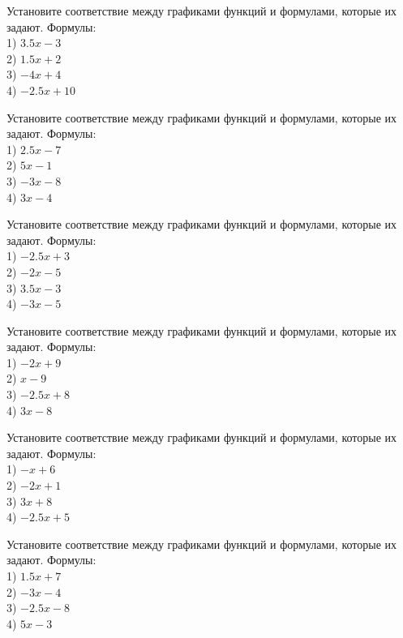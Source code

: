 \documentclass[4apaper]{article}
\begin{document}
\begin{taskBN}{49}
Установите соответствие между графиками функций и формулами, которые их задают. Формулы: \\1) $3.5x-3$\\2) $1.5x+2$\\3) $-4x+4$\\4) $-2.5x+10$
\end{taskBN}

\begin{taskBN}{50}
Установите соответствие между графиками функций и формулами, которые их задают. Формулы: \\1) $2.5x-7$\\2) $5x-1$\\3) $-3x-8$\\4) $3x-4$
\end{taskBN}

\begin{taskBN}{51}
Установите соответствие между графиками функций и формулами, которые их задают. Формулы: \\1) $-2.5x+3$\\2) $-2x-5$\\3) $3.5x-3$\\4) $-3x-5$
\end{taskBN}

\begin{taskBN}{52}
Установите соответствие между графиками функций и формулами, которые их задают. Формулы: \\1) $-2x+9$\\2) $x-9$\\3) $-2.5x+8$\\4) $3x-8$
\end{taskBN}

\begin{taskBN}{53}
Установите соответствие между графиками функций и формулами, которые их задают. Формулы: \\1) $-x+6$\\2) $-2x+1$\\3) $3x+8$\\4) $-2.5x+5$
\end{taskBN}

\begin{taskBN}{54}
Установите соответствие между графиками функций и формулами, которые их задают. Формулы: \\1) $1.5x+7$\\2) $-3x-4$\\3) $-2.5x-8$\\4) $5x-3$
\end{taskBN}
\end{document}
